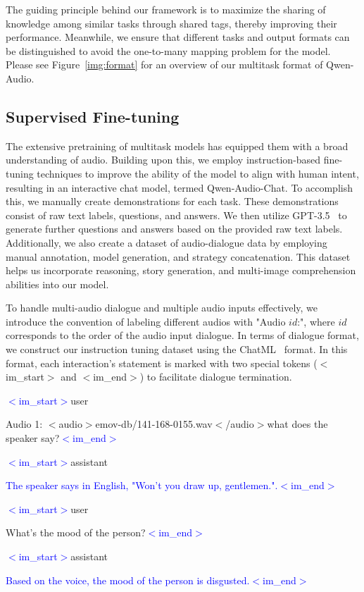 \documentclass{article}
\begin{document}
The guiding principle behind our framework is to maximize the sharing of knowledge among similar tasks through shared tags, thereby improving their performance. Meanwhile, we ensure that different tasks and output formats can be distinguished to avoid the one-to-many mapping problem for the model. Please see Figure~\ref{img:format} for an overview of our multitask format of Qwen-Audio.




\subsection{Supervised Fine-tuning}\label{exp:sft}
The extensive pretraining of multitask models has equipped them with a broad understanding of audio. Building upon this, we employ instruction-based fine-tuning techniques to improve the ability of the model to align with human intent, resulting in an interactive chat model, termed Qwen-Audio-Chat. 
To accomplish this, we manually create demonstrations for each task. These demonstrations consist of raw text labels, questions, and answers. We then utilize GPT-3.5~\citep{chatgpt} to generate further questions and answers based on the provided raw text labels. Additionally, we also create a dataset of audio-dialogue data by employing manual annotation, model generation, and strategy concatenation. This dataset helps us incorporate reasoning, story generation, and multi-image comprehension abilities into our model. 

To handle multi-audio dialogue and multiple audio inputs effectively, we introduce the convention of labeling different audios with "Audio $id$:", where $id$ corresponds to the order of the audio input dialogue. In terms of dialogue format, we construct our instruction tuning dataset using the ChatML~\citep{chatml} format. In this format, each interaction's statement is marked with two special tokens ($<$im\_start$>$ and $<$im\_end$>$) to facilitate dialogue termination. 


\begin{tcolorbox}[colback=black!5!white,colframe=black!75!black,title=The Data Format Example of Supervised Fine-Tuning.]
\textcolor{blue}{$<$im\_start$>$}user

Audio 1: $<$audio$>$emov-db/141-168-0155.wav$<$/audio$>$what does the speaker say?\textcolor{blue}{$<$im\_end$>$}

\textcolor{blue}{$<$im\_start$>$}assistant

\textcolor{blue}{The speaker says in English, "Won't you draw up, gentlemen.".$<$im\_end$>$}

\textcolor{blue}{$<$im\_start$>$}user

What's the mood of the person?\textcolor{blue}{$<$im\_end$>$}

\textcolor{blue}{$<$im\_start$>$}assistant

\textcolor{blue}{Based on the voice, the mood of the person is disgusted.$<$im\_end$>$}
\end{tcolorbox}
\end{document}
